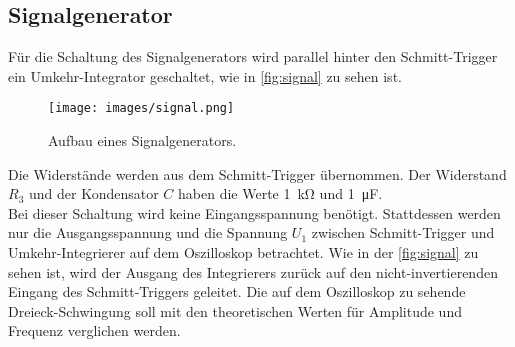 \subsection{Signalgenerator}
Für die Schaltung des Signalgenerators wird parallel hinter den Schmitt-Trigger ein Umkehr-Integrator geschaltet, wie in \autoref{fig:signal} zu sehen ist.

\begin{figure}[H]
    \centering
    \texttt{[image: images/signal.png]}
    \caption{Aufbau eines Signalgenerators.\cite{V51}}
    \label{fig:signal}
\end{figure}

Die Widerstände werden aus dem Schmitt-Trigger übernommen.
Der Widerstand $R_3$ und der Kondensator $C$ haben die Werte \SI{1}{\kilo\ohm} und \SI{1}{\micro\farad}.\\
Bei dieser Schaltung wird keine Eingangsspannung benötigt.
Stattdessen werden nur die Ausgangsspannung und die Spannung $U_1$ zwischen Schmitt-Trigger und Umkehr-Integrierer auf dem Oszilloskop betrachtet.
Wie in der \autoref{fig:signal} zu sehen ist, wird der Ausgang des Integrierers zurück auf den nicht-invertierenden Eingang des Schmitt-Triggers geleitet.
Die auf dem Oszilloskop zu sehende Dreieck-Schwingung soll mit den theoretischen Werten für Amplitude und Frequenz verglichen werden.